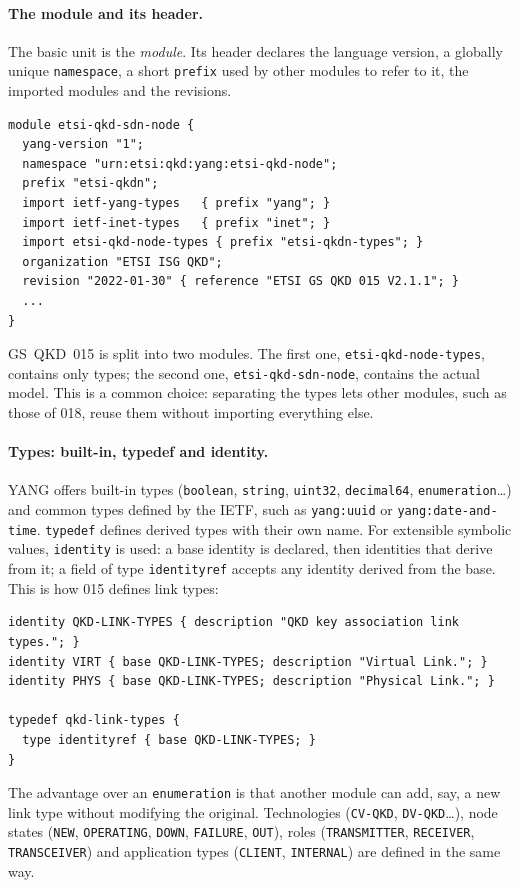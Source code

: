 \paragraph{The module and its header.}
The basic unit is the \emph{module}. Its header declares the language
version, a globally unique \texttt{namespace}, a short \texttt{prefix} used
by other modules to refer to it, the imported modules and the revisions.
\begin{lstlisting}[language=yang]
module etsi-qkd-sdn-node {
  yang-version "1";
  namespace "urn:etsi:qkd:yang:etsi-qkd-node";
  prefix "etsi-qkdn";
  import ietf-yang-types   { prefix "yang"; }
  import ietf-inet-types   { prefix "inet"; }
  import etsi-qkd-node-types { prefix "etsi-qkdn-types"; }
  organization "ETSI ISG QKD";
  revision "2022-01-30" { reference "ETSI GS QKD 015 V2.1.1"; }
  ...
}
\end{lstlisting}
GS~QKD~015 is split into two modules. The first one,
\texttt{etsi-qkd-node-types}, contains only types; the second one,
\texttt{etsi-qkd-sdn-node}, contains the actual model. This is
a common choice: separating the types lets other modules, such as those of
018, reuse them without importing everything else.

\paragraph{Types: built-in, typedef and identity.}
YANG offers built-in types (\texttt{boolean}, \texttt{string},
\texttt{uint32}, \texttt{decimal64}, \texttt{enumeration}\dots) and common
types defined by the IETF, such as \texttt{yang:uuid} or
\texttt{yang:date-and-time}. \texttt{typedef} defines derived types with
their own name. For extensible symbolic values, \texttt{identity} is used:
a base identity is declared, then identities that derive from it; a field
of type \texttt{identityref} accepts any identity derived from the base.
This is how 015 defines link types:
\begin{lstlisting}[language=yang]
identity QKD-LINK-TYPES { description "QKD key association link types."; }
identity VIRT { base QKD-LINK-TYPES; description "Virtual Link."; }
identity PHYS { base QKD-LINK-TYPES; description "Physical Link."; }

typedef qkd-link-types {
  type identityref { base QKD-LINK-TYPES; }
}
\end{lstlisting}
The advantage over an \texttt{enumeration} is that another module can add,
say, a new link type without modifying the original. Technologies
(\texttt{CV-QKD}, \texttt{DV-QKD}\dots), node states (\texttt{NEW},
\texttt{OPERATING}, \texttt{DOWN}, \texttt{FAILURE}, \texttt{OUT}), roles
(\texttt{TRANSMITTER}, \texttt{RECEIVER}, \texttt{TRANSCEIVER}) and
application types (\texttt{CLIENT}, \texttt{INTERNAL}) are defined in the
same way.

